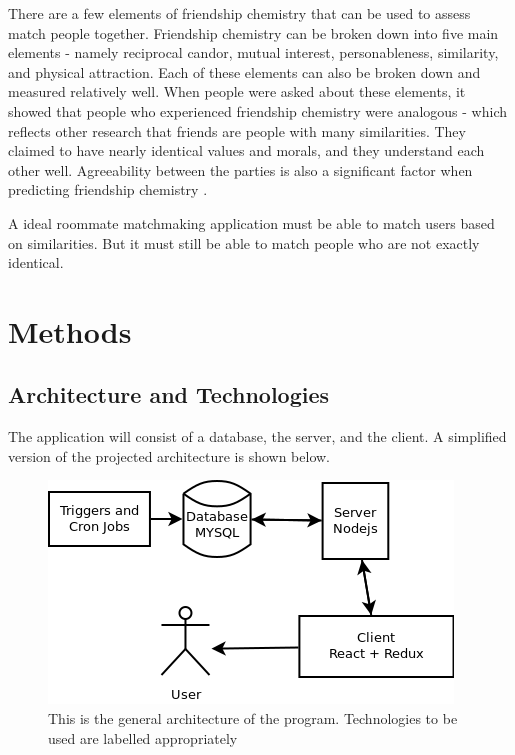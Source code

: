 \documentclass[journal]{./IEEE/IEEEtran}
\begin{document}
There are a few elements of friendship chemistry that can be used to assess match people together. Friendship chemistry can be broken down into five main elements - namely reciprocal candor, mutual interest, personableness, similarity, and physical attraction\cite{f_chemistry}. Each of these elements can also be broken down and measured relatively well. When people were asked about these elements, it showed that people who experienced friendship chemistry were analogous\cite{f_chemistry} - which reflects other research that friends are people with many similarities\cite{similar}. They claimed to have nearly identical values and morals, and they understand each other well\cite{f_chemistry}. Agreeability between the parties is also a significant factor when predicting friendship chemistry \cite{f_chemistry}.

A ideal roommate matchmaking application must be able to match users based on similarities. But it must still be able to match people who are not exactly identical.

\section{Methods}

\subsection{Architecture and Technologies}
The application will consist of a database, the server, and the client. A simplified version of the projected architecture is shown below.
\\
\begin{figure}[h]
\centering
\includegraphics[scale=0.5]{Architecture}
\caption{This is the general architecture of the program. Technologies to be used are labelled appropriately}
\end{figure}
\end{document}
